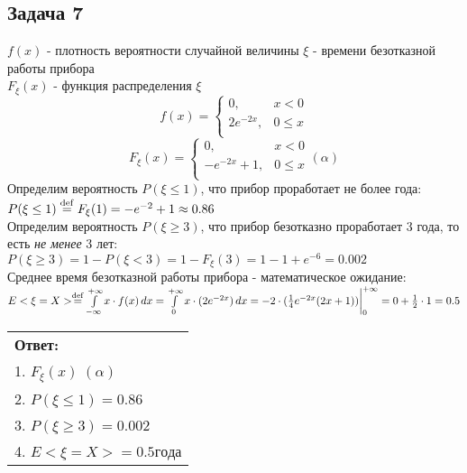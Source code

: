 \documentclass[12pt]{article}
\begin{document}
		\subsection*{Задача 7}	
			$f(x)$ - плотность вероятности случайной величины $\xi$ - времени безотказной работы прибора\\
			$F_{\xi}(x)$ - функция распределения $\xi$\\
			$$
			f(x) =
			\begin{cases}
			0, & x < 0 \\
			2e^{-2x}, & 0 \leq x \\ 
			\end{cases}
			$$
			$$
			F_{\xi}(x) = 
			\begin{cases}
			0, & x < 0 \\
			-e^{-2x} + 1, & 0 \leq x \\ 
			\end{cases} (\alpha)
			$$
			Определим вероятность $P(\xi \leq 1)$, что прибор проработает не более года:\\
			$P(\xi \leq 1) \stackrel{\rm def}{=} F_{\xi}(1) = -e^{-2} + 1 \approx 0.86$ \\
			Определим вероятность $P(\xi \geq 3)$, что прибор безотказно проработает 3 года, то есть \textit{не менее} 3 лет: \\
			$P(\xi \geq 3) = 1 - P(\xi < 3) = 1 - F_{\xi}(3) = 1 - 1 + e^{-6} = 0.002$ \\
			Среднее время безотказной работы прибора - математическое ожидание:\\
			$E<\xi = X> \stackrel{\rm def}{=} \int\limits_{-\infty}^{+\infty}x\cdot f(x)\,dx = \int\limits_{0}^{+\infty}x\cdot(2e^{-2x})\,dx = -2\cdot (\frac{1}{4}e^{-2x}(2x + 1))\bigg|_{0}^{+\infty} = 0 + \frac{1}{2}\cdot 1 = 0.5$\\
			\begin{tabular}{|l|}
				\hline
				\textbf{Ответ:} \\ 
				1. $F_{\xi}(x) \; (\alpha)$ \\
				2. $P(\xi \leq 1) = 0.86$ \\
				3. $P(\xi \geq 3) = 0.002$ \\
				4. $E<\xi = X> = 0.5 года$ \\
				\hline
			\end{tabular}			
\end{document}

